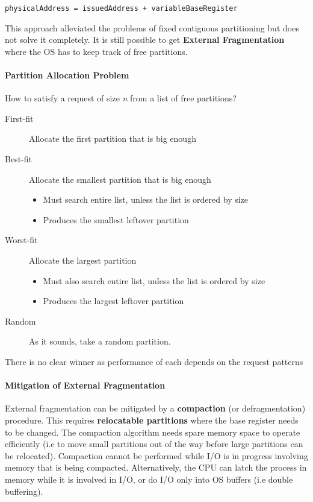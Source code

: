 \documentclass{article}%
\begin{document}
\texttt{physicalAddress = issuedAddress + variableBaseRegister}

This approach alleviated the problems of fixed contiguous partitioning but does not solve it completely.
It is still possible to get \textbf{External Fragmentation} where the OS has to keep track of free partitions.

\paragraph{Partition Allocation Problem}
\label{sec:org0d0cc34}
How to satisfy a request of size \emph{n} from a list of free partitions?
\begin{description}
\item[{First-fit}] Allocate the first partition that is big enough
\item[{Best-fit}] Allocate the smallest partition that is big enough
\begin{itemize}
\item Must search entire list, unless the list is ordered by size
\item Produces the smallest leftover partition
\end{itemize}
\item[{Worst-fit}] Allocate the largest partition
\begin{itemize}
\item Must also search entire list, unless the list is ordered by size
\item Produces the largest leftover partition
\end{itemize}
\item[{Random}] As it sounds, take a random partition.
\end{description}
There is no clear winner as performance of each depends on the request patterns

\paragraph{Mitigation of External Fragmentation}
\label{sec:orgba7305a}
External fragmentation can be mitigated by a \textbf{compaction} (or defragmentation) procedure.
This requires \textbf{relocatable partitions} where the base register needs to be changed.
The compaction algorithm needs spare memory space to operate efficiently (i.e to move small partitions out of the way before large partitions can be relocated).
Compaction cannot be performed while I/O is in progress involving memory that is being compacted.
Alternatively, the CPU can latch the process in memory while it is involved in I/O, or do I/O only into OS buffers (i.e double buffering).
\end{document}
